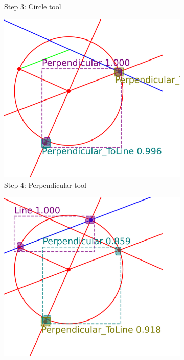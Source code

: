 \begin{figure}[!htb]
\begin{subfigure}[t]{0.32\textwidth}
         \caption{Step 3: Circle tool}
         \label{fig:Gamma08_example_step3}
     \end{subfigure}
     \hfill
     \begin{subfigure}[t]{0.32\textwidth}
         \centering
         \includegraphics[width=\textwidth]{img/Gamma-08_example/output_image3.png}
         \caption{Step 4: Perpendicular tool}
         \label{fig:Gamma08_example_step4}
     \end{subfigure}
     \hfill
     \begin{subfigure}[t]{0.32\textwidth}
         \centering
         \includegraphics[width=\textwidth]{img/Gamma-08_example/output_image4.png}

\end{subfigure}
\end{figure}
